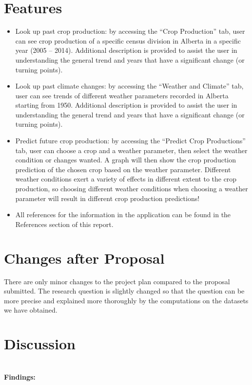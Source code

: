 \documentclass[fontsize=11pt]{article}
\begin{document}
\section*{Features}
\begin{itemize}
    \item Look up past crop production: by accessing the “Crop Production” tab, user can see crop production of a specific census division in Alberta in a specific year (2005 – 2014). Additional description is provided to assist the user in understanding the general trend and years that have a significant change (or turning points).
    \item Look up past climate changes: by accessing the “Weather and Climate” tab, user can see trends of different weather parameters recorded in Alberta starting from 1950. Additional description is provided to assist the user in understanding the general trend and years that have a significant change (or turning points).
    \item Predict future crop production: by accessing the “Predict Crop Productions” tab, user can choose a crop and a weather parameter, then select the weather condition or changes wanted. A graph will then show the crop production prediction of the chosen crop based on the weather parameter. Different weather conditions exert a variety of effects in different extent to the crop production, so choosing different weather conditions when choosing a weather parameter will result in different crop production predictions! 
    \item All references for the information in the application can be found in the References section of this report.
\end{itemize}

\section*{Changes after Proposal}
There are only minor changes to the project plan compared to the proposal submitted. The research question is slightly changed so that the question can be more precise and explained more thoroughly by the computations on the datasets we have obtained. 

\section*{Discussion}\\
\textbf{Findings:} \\
\end{document}
